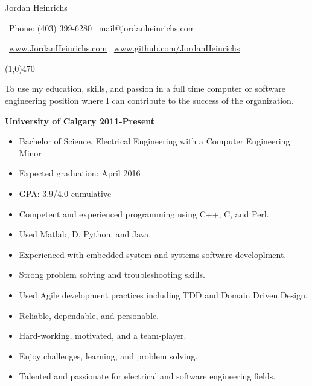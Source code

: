 \documentclass[12pt]{article}
\begin{document}

\centerline{{\Huge \sc Jordan Heinrichs}}
\medskip
\centerline{\textbullet\ Phone: (403) 399-6280 \hspace{5pt} \textbullet\ mail@jordanheinrichs.com}
\centerline{\textbullet\ \url{www.JordanHeinrichs.com}  \hspace{5pt} \textbullet\ \url{www.github.com/JordanHeinrichs}}
\noindent
\line(1,0){470}\\

\medskip
{}
\medskip

\noindent To use my education, skills, and passion in a full time computer or software engineering position where I can contribute to the success of the organization.

\bigskip
{}
\medskip

\noindent \centerline{ \bf University of Calgary \hfill 2011-Present}
\begin{itemize}[parsep=0pt,partopsep=0pt]
  \item Bachelor of Science, Electrical Engineering with a Computer Engineering Minor
  \item Expected graduation: April 2016
  \item GPA: 3.9/4.0 cumulative
\end{itemize}

\bigskip
{}
\medskip
\begin{itemize}
\item Competent and experienced programming using C++, C, and Perl.
\item Used Matlab, D, Python, and Java.
\item Experienced with embedded system and systems software developlment.
\item Strong problem solving and troubleshooting skills.
\item Used Agile development practices including TDD and Domain Driven Design.
\bigskip
\item Reliable, dependable, and personable.
\item Hard-working, motivated, and a team-player.
\item Enjoy challenges, learning, and problem solving.
\item Talented and passionate for electrical and software engineering fields.
\end{itemize}
\noindent

\bigskip
{}
\medskip
\end{document}
